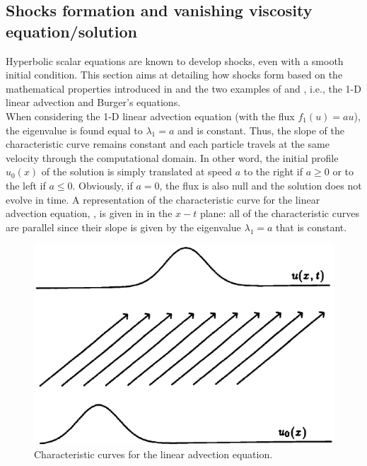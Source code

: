 \subsection{Shocks formation and vanishing viscosity equation/solution}\label{sec:shock_form_sct1b}
Hyperbolic scalar equations are known to develop shocks, even with a smooth initial condition. This section aims at detailing how shocks form based on the mathematical properties introduced in  and the two examples of  and , i.e., the 1-D linear advection and Burger's equations.\\

When considering the 1-D linear advection equation (with the flux $f_1(u) = au$), the eigenvalue is found equal to $\lambda_1=a$ and is constant. Thus, the slope of the characteristic curve remains constant and each particle travels at the same velocity through the computational domain. In other word, the initial profile $u_0(x)$ of the solution is simply translated at speed $a$ to the right if $a \geq 0$ or to the left if $a \leq 0$. Obviously, if $a=0$, the flux is also null and the solution does not evolve in time. A representation of the characteristic curve for the linear advection equation, , is given in  in the $x-t$ plane: all of the characteristic curves are parallel since their slope is given by the eigenvalue $\lambda_1=a$ that is constant.
%
\begin{figure}[H]
\centering
\includegraphics[width=\textwidth]{figures/charact_curves_linear_transport.png}
\caption{Characteristic curves for the linear advection equation.}
\label{fig:char_curve_sct1b}
\end{figure}
